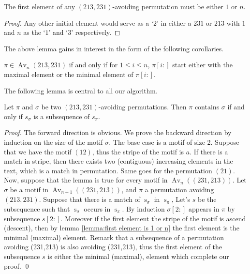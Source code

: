 \documentclass[a4paper]{llncs}
\DeclareMathOperator{\AV}{Av}
\DeclareMathOperator{\Avd}{Av}
\newcommand\Av[2]{\Avd_{{#1}}({#2})}
\newcommand{\ptext}{\pi}
\newcommand{\pmotif}{\sigma}
\DeclareMathOperator{\stripea}{s}
\newcommand{\stripew}[1]{\stripea_{{#1}}}
\newcommand{\ustep}{a}
\begin{document}
\begin{lemma}[Folklore]
\label{lemma:first element is 1 or n}
The first element of any $(213,231)$-avoiding permutation
must be either $1$ or $n$.
\end{lemma}

\begin{proof} 
Any other initial element would serve as a `$2$' in either a 
$231$ or $213$ with $1$ and $n$ as the `$1$' and `$3$' respectively.
\end{proof}
	
The above lemma gains in interest in the form of the following corollaries.

\begin{corollary}
\label{corollary:minmaxelement}
$\pi \in \AV_n(213,231)$ if and only if for $1 \leq i \leq n$, 
$\pi[i:]$ start either with the maximal element
or the minimal element of $\pi[i:]$.
\end{corollary}

The following lemma is central to all our algorithm.

\begin{lemma}
\label{lemma:MatchStripeToPermutation}
	Let $\pi$ and $\sigma$ be two $(213,231)$-avoiding permutations.
	Then $\pi$ contains $\sigma$ if and only if 
	$s_\sigma$ is a subsequence of $s_\pi$.
\end{lemma}	 
	 
\begin{proof} 
	The forward direction is obvious.
	We prove the backward direction by induction on the size of the motif
	$\sigma$.
	The base case is a motif of size 2. Suppose that we have the motif $(12)$, thus the stripe of the motif is $\ustep$. If there is a match in stripe, then there exists two (contiguous) increasing elements in the text, which is a match in permutation. Same goes for the permutation $(21)$. Now, suppose that the lemma is true for every motif in $\Av{n}{(231,213)}$. Let $\pmotif$ be a motif in $\Av{n+1}{(231,213)}$, and $\ptext$ a permutation avoiding $(213,231)$. Suppose that there is a match of $\stripew{\pmotif}$ in $\stripew{\ptext}$, Let's $s$ be the subsequence such that $\stripew{\pmotif}$ occurs in $\stripew{\ptext}$.
	By induction $\pmotif[2:]$ appears in $\ptext$ by subsequence $s[2:]$.
	Moreover if the first element the stripe of the motif is ascend (descent), then by lemma \ref{lemma:first element is 1 or n} the first element is the minimal (maximal) element. Remark that a subsequence of a permutation avoiding (231,213) is also avoiding (231,213), thus the first element of the subsequence $s$ is either the minimal (maximal), element which complete our proof.
\qed
\end{proof}	 
\end{document}

